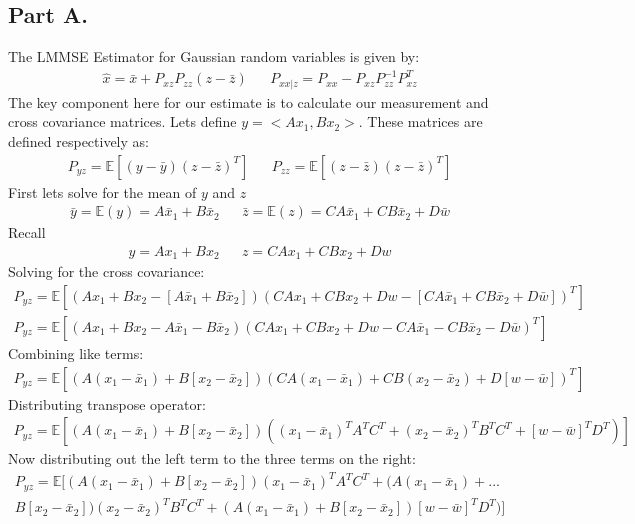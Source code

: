 \documentclass{article}
\begin{document}
\subsection*{Part A.}
The LMMSE Estimator for Gaussian random variables is given by:
\begin{align*}
\hat{x} = \bar{x} + P_{xz}P_{zz} (z-\bar{z}) && P_{xx|z} = P_{xx} - P_{xz} P_{zz}^{-1} P_{xz}^T
\end{align*}
The key component here for our estimate is to calculate our measurement and cross covariance matrices. Lets define $y=<Ax_1,Bx_2>$. These matrices are defined respectively as:
\begin{align*}
P_{yz} = \mathbb{E}[(y-\bar{y})(z-\bar{z})^T] && P_{zz} = \mathbb{E}[(z-\bar{z})(z-\bar{z})^T]
\end{align*}
First lets solve for the mean of $y$ and $z$
\begin{align*}
\bar{y}=\mathbb{E}(y) = A\bar{x}_1 + B\bar{x}_2 && \bar{z} = \mathbb{E}(z) = CA\bar{x}_1 + CB\bar{x}_2 + D\bar{w}
\end{align*}
Recall
\begin{align*}
y=A x_1 + B x_2 && z = C A x_1 + C B x_2+ D w
\end{align*}
Solving for the cross covariance:
\begin{align*}
P_{yz} = \mathbb{E}[(A x_1 + B x_2-[A\bar{x}_1 + B\bar{x}_2])(C A x_1 + C B x_2+ D w-[CA\bar{x}_1 + CB\bar{x}_2 + D\bar{w}])^T] \\
P_{yz} = \mathbb{E}[(A x_1 + B x_2-A\bar{x}_1 - B\bar{x}_2)(C A x_1 + C B x_2+ D w-CA\bar{x}_1 - CB\bar{x}_2 - D\bar{w})^T]
\end{align*}
Combining like terms:
\begin{align*}
P_{yz} = \mathbb{E}[(A (x_1-\bar{x}_1) + B [x_2-\bar{x}_2]) (CA(x_1-\bar{x}_1) + CB(x_2-\bar{x}_2) + D[w-\bar{w}])^T]
\end{align*}
Distributing transpose operator:
\begin{align*}
P_{yz} = \mathbb{E}[(A (x_1-\bar{x}_1) + B [x_2-\bar{x}_2]) ((x_1-\bar{x}_1)^T A^T C^T + (x_2-\bar{x}_2)^T B^T C^T + [w-\bar{w}]^T D^T)]
\end{align*}
Now distributing out the left term to the three terms on the right:
\begin{align*}
P_{yz} = \mathbb{E}[ (A (x_1-\bar{x}_1) + B [x_2-\bar{x}_2])(x_1-\bar{x}_1)^T A^T C^T + (A (x_1-\bar{x}_1) +... \\B [x_2-\bar{x}_2])(x_2-\bar{x}_2)^T B^T C^T + (A (x_1-\bar{x}_1) + B [x_2-\bar{x}_2])[w-\bar{w}]^T D^T)]
\end{align*}
\end{document}

